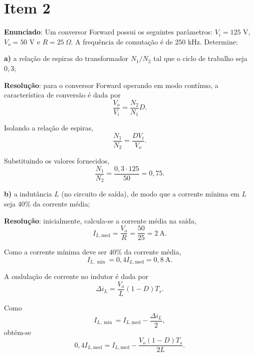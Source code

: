 \section*{Item 2}\label{it:2}

\textbf{Enunciado}: Um conversor Forward possui os seguintes parâmetros: $V_i = 125$ V, $V_o = 50$ V e $R = 25~\Omega$. A frequência de comutação é de $250$ kHz. Determine:

\medskip
\textbf{a)} a relação de espiras do transformador $N_1/N_2$ tal que o ciclo de trabalho seja $0,3$;

\medskip
\textbf{Resolução}: para o conversor Forward operando em modo contínuo, a característica de conversão é dada por~\cite{forward_notas}
\begin{equation*}
	\frac{V_o}{V_i}
	=
	\frac{N_2}{N_1}D.
\end{equation*}

Isolando a relação de espiras,
\begin{equation*}
	\frac{N_1}{N_2}
	=
	\frac{D V_i}{V_o}.
\end{equation*}

Substituindo os valores fornecidos,
\begin{equation*}
	\frac{N_1}{N_2}
	=
	\frac{0{,}3\cdot125}{50}
	=
	0{,}75.
\end{equation*}

\medskip
\textbf{b)} a indutância $L$ (no circuito de saída), de modo que a corrente mínima em $L$ seja $40\%$ da corrente média;

\medskip
\textbf{Resolução}: inicialmente, calcula-se a corrente média na saída,
\begin{equation*}
	I_{L,\mathrm{med}}
	=
	\frac{V_o}{R}
	=
	\frac{50}{25}
	=
	2~\mathrm{A}.
\end{equation*}

Como a corrente mínima deve ser $40\%$ da corrente média,
\begin{equation*}
	I_{L,\min}
	=
	0{,}4I_{L,\mathrm{med}}
	=
	0{,}8~\mathrm{A}.
\end{equation*}

A ondulação de corrente no indutor é dada por~\cite{forward_notas}
\begin{equation*}
	\Delta i_L
	=
	\frac{V_o}{L}(1-D)T_s.
\end{equation*}

Como
\begin{equation*}
	I_{L,\min}
	=
	I_{L,\mathrm{med}}
	-
	\frac{\Delta i_L}{2},
\end{equation*}
obtém-se
\begin{equation*}
	0{,}4I_{L,\mathrm{med}}
	=
	I_{L,\mathrm{med}}
	-
	\frac{V_o(1-D)T_s}{2L}.
\end{equation*}


